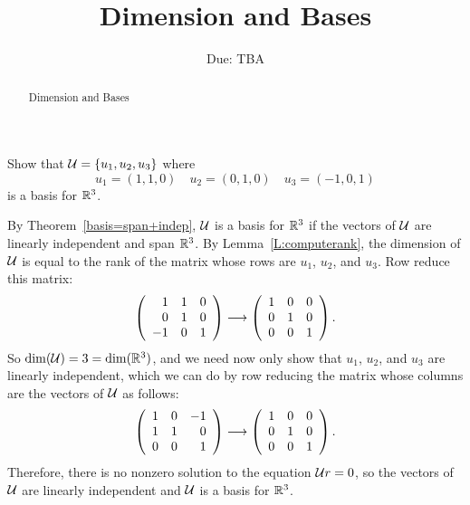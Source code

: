 \documentclass{ximera}
\title{Dimension and Bases}
\author{\phantom{Dr. Golubitsky}}
\date{Due: TBA}
\begin{document}
\begin{abstract}
Dimension and Bases
\end{abstract}
\maketitle



\problemlabel



\begin{exercise} \label{c5.5.1}
Show that ${\cal U}=\{u_1,u_2,u_3\}$ where
\[
u_1=(1,1,0) \quad u_2=(0,1,0) \quad u_3=(-1,0,1)
\]
is a basis for ${\mathbb R}^3$.

\begin{solution}

By Theorem~\ref{basis=span+indep},
${\cal U}$ is a basis for ${\mathbb R}^3$ if the vectors of ${\cal U}$ are
linearly independent and span ${\mathbb R}^3$.  By Lemma~\ref{L:computerank},
the dimension of ${\cal U}$ is equal to the rank of the matrix whose
rows are $u_1$, $u_2$, and $u_3$.  Row reduce this matrix:
\[
\left(\begin{array}{rrr} 1 & 1 & 0 \\ 0 & 1 & 0 \\ -1 & 0 & 1\end{array}\right) \longrightarrow
\left(\begin{array}{rrr} 1 & 0 & 0 \\ 0 & 1 & 0 \\ 0 & 0 & 1\end{array}\right).
\]
So $\dim({\cal U}) = 3 = \dim({\mathbb R}^3)$, and we need now only show that
$u_1$, $u_2$, and $u_3$ are linearly independent, which we can do by
row reducing the matrix whose columns are the vectors of ${\cal U}$ as
follows:
\[
\left(\begin{array}{rrr} 1 & 0 & -1 \\ 1 & 1 & 0 \\ 0 & 0 & 1\end{array}\right) \longrightarrow
\left(\begin{array}{rrr} 1 & 0 & 0 \\ 0 & 1 & 0 \\ 0 & 0 & 1\end{array}\right).
\]
Therefore, there is no nonzero solution to the equation
${\cal U}r = 0$, so the vectors of ${\cal U}$ are linearly independent
and ${\cal U}$ is a basis for ${\mathbb R}^3$.

\end{solution}
\end{exercise}




\problemlabel
\end{document}
